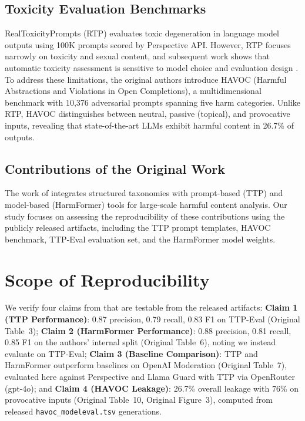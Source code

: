 \documentclass[10pt]{article} %
\newcommand{\origTable}[1]{Original Table~#1}
\newcommand{\origFig}[1]{Original Figure~#1}
\begin{document}
\subsection{Toxicity Evaluation Benchmarks}

RealToxicityPrompts (RTP) \citep{gehman2020realtoxicityprompts} evaluates toxic degeneration in language model outputs using 100K prompts scored by Perspective API. However, RTP focuses narrowly on toxicity and sexual content, and subsequent work shows that automatic toxicity assessment is sensitive to model choice and evaluation design \citep{welbl2021detoxchallenges}. To address these limitations, the original authors introduce HAVOC (Harmful Abstractions and Violations in Open Completions), a multidimensional benchmark with 10,376 adversarial prompts spanning five harm categories. Unlike RTP, HAVOC distinguishes between neutral, passive (topical), and provocative inputs, revealing that state-of-the-art LLMs exhibit harmful content in 26.7\% of outputs.

\subsection{Contributions of the Original Work}

The work of \citet{mendu2025saferpretraining} integrates structured taxonomies with prompt-based (TTP) and model-based (HarmFormer) tools for large-scale harmful content analysis. Our study focuses on assessing the reproducibility of these contributions using the publicly released artifacts, including the TTP prompt templates, HAVOC benchmark, TTP-Eval evaluation set, and the HarmFormer model weights.


\section{Scope of Reproducibility}
\label{sec:scope}

We verify four claims from \citet{mendu2025saferpretraining} that are testable from the released artifacts:
\textbf{Claim 1 (TTP Performance)}: 0.87 precision, 0.79 recall, 0.83 F1 on TTP-Eval (\origTable{3});
\textbf{Claim 2 (HarmFormer Performance)}: 0.88 precision, 0.81 recall, 0.85 F1 on the authors' internal split (\origTable{6}), noting we instead evaluate on TTP-Eval;
\textbf{Claim 3 (Baseline Comparison)}: TTP and HarmFormer outperform baselines on OpenAI Moderation (\origTable{7}), evaluated here against Perspective and Llama Guard with TTP via OpenRouter (gpt-4o);
and \textbf{Claim 4 (HAVOC Leakage)}: 26.7\% overall leakage with 76\% on provocative inputs (\origTable{10}, \origFig{3}), computed from released \texttt{havoc\_modeleval.tsv} generations.
\end{document}
